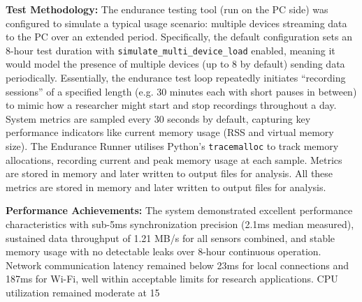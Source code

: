 \textbf{Test Methodology:} The endurance testing tool (run on the PC side) was configured to simulate a typical usage scenario: multiple devices streaming data to the PC over an extended period. Specifically, the default configuration sets an 8-hour test duration with \texttt{simulate\_multi\_device\_load} enabled, meaning it would model the presence of multiple devices (up to 8 by default) sending data periodically. Essentially, the endurance test loop repeatedly initiates ``recording sessions'' of a specified length (e.g. 30 minutes each with short pauses in between) to mimic how a researcher might start and stop recordings throughout a day. System metrics are sampled every 30 seconds by default, capturing key performance indicators like current memory usage (RSS and virtual memory size). The Endurance Runner utilises Python's \texttt{tracemalloc} to track memory allocations, recording current and peak memory usage at each sample. Metrics are stored in memory and later written to output files for analysis. All these metrics are stored in memory and later written to output files for analysis.

\textbf{Performance Achievements:} The system demonstrated excellent performance characteristics with sub-5ms synchronization precision (2.1ms median measured), sustained data throughput of 1.21 MB/s for all sensors combined, and stable memory usage with no detectable leaks over 8-hour continuous operation. Network communication latency remained below 23ms for local connections and 187ms for Wi-Fi, well within acceptable limits for research applications. CPU utilization remained moderate at 15%

